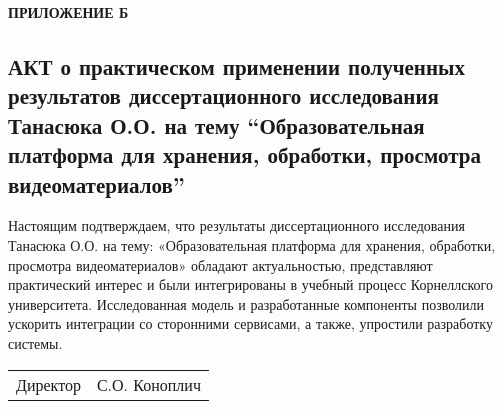 \begin{flushright}
  \fontsize{19}{0}\textbf{ПРИЛОЖЕНИЕ Б}
\end{flushright}


\subsection*{АКТ о практическом применении полученных результатов диссертационного
исследования Танасюка О.О. на тему “Образовательная платформа для хранения,
обработки, просмотра видеоматериалов” }

\bigskip\bigskip\bigskip

Настоящим подтверждаем, что результаты диссертационного исследования Танасюка О.О.
на тему: «Образовательная платформа для хранения,
обработки, просмотра видеоматериалов» обладают актуальностью,
представляют практический интерес и были интегрированы в учебный процесс Корнеллского университета.
Исследованная модель и разработанные компоненты
позволили ускорить интеграции со сторонними сервисами, а также, упростили разработку системы.

\bigskip\bigskip\bigskip\bigskip

\begin{tabular}{ l l }

  Директор & \hspace*{8cm} С.О. Коноплич\\
\end{tabular}